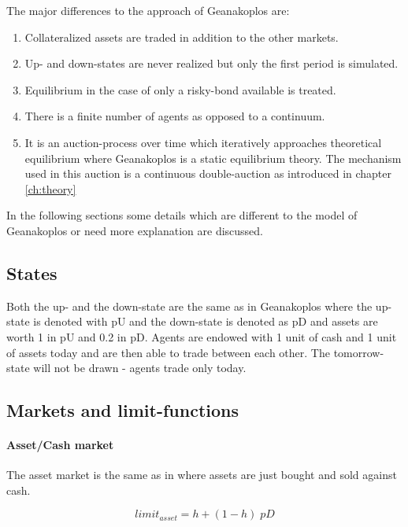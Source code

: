 \documentclass[../Bachelorarbeit.tex]{subfiles}
\begin{document}
The major differences to the approach of Geanakoplos are:
\begin{enumerate}
\item Collateralized assets are traded in addition to the other markets.
\item Up- and down-states are never realized but only the first period is simulated.
\item Equilibrium in the case of only a risky-bond available is treated.
\item There is a finite number of agents as opposed to a continuum.
\item It is an auction-process over time which iteratively approaches theoretical equilibrium where Geanakoplos is a static equilibrium theory. The mechanism used in this auction is a continuous double-auction as introduced in chapter \ref{ch:theory}
\end{enumerate}

In the following sections some details which are different to the model of Geanakoplos or need more explanation are discussed.

\subsection{States}
Both the up- and the down-state are the same as in Geanakoplos where the up-state is denoted with pU and the down-state is denoted as pD and assets are worth 1 in pU and 0.2 in pD. Agents are endowed with 1 unit of cash and 1 unit of assets today and are then able to trade between each other. The tomorrow-state will not be drawn - agents trade only today.

\subsection{Markets and limit-functions}
\label{sec:LIMIT_FUNCTIONS}

\paragraph{Asset/Cash market}
The asset market is the same as in \cite{Geanakoplos2009} where assets are just bought and sold against cash.

\begin{equation}
limit_{asset} = h + ( 1 - h ) \; pD
\end{equation}
\end{document}
